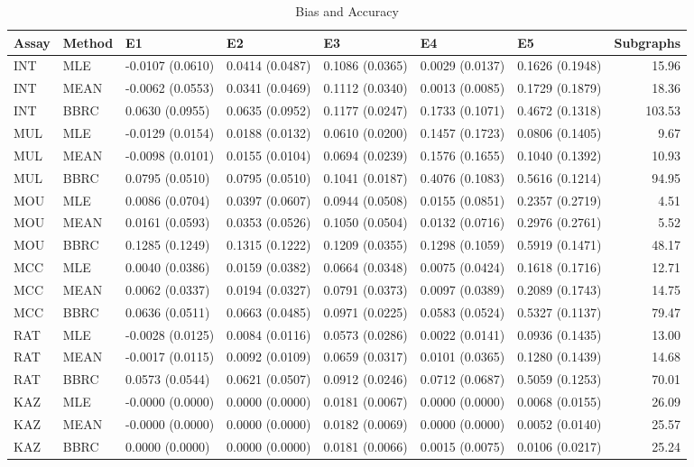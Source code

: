 \begin{table}[t]
\begin{center}
  {\small \begin{tabular}{lllllllr}
  \hline
 Assay & Method & E1 & E2 & E3 & E4 & E5 & Subgraphs \\ 
  \hline
  INT & MLE & -0.0107 (0.0610) & 0.0414 (0.0487) & 0.1086 (0.0365) & 0.0029 (0.0137) & 0.1626 (0.1948) & 15.96 \\ 
  INT & MEAN & -0.0062 (0.0553) & 0.0341 (0.0469) & 0.1112 (0.0340) & 0.0013 (0.0085) & 0.1729 (0.1879) & 18.36 \\ 
  INT & BBRC & 0.0630 (0.0955) & 0.0635 (0.0952) & 0.1177 (0.0247) & 0.1733 (0.1071) & 0.4672 (0.1318) & 103.53 \\ 
  MUL & MLE & -0.0129 (0.0154) & 0.0188 (0.0132) & 0.0610 (0.0200) & 0.1457 (0.1723) & 0.0806 (0.1405) & 9.67 \\ 
  MUL & MEAN & -0.0098 (0.0101) & 0.0155 (0.0104) & 0.0694 (0.0239) & 0.1576 (0.1655) & 0.1040 (0.1392) & 10.93 \\ 
  MUL & BBRC & 0.0795 (0.0510) & 0.0795 (0.0510) & 0.1041 (0.0187) & 0.4076 (0.1083) & 0.5616 (0.1214) & 94.95 \\ 
  MOU & MLE & 0.0086 (0.0704) & 0.0397 (0.0607) & 0.0944 (0.0508) & 0.0155 (0.0851) & 0.2357 (0.2719) & 4.51 \\ 
  MOU & MEAN & 0.0161 (0.0593) & 0.0353 (0.0526) & 0.1050 (0.0504) & 0.0132 (0.0716) & 0.2976 (0.2761) & 5.52 \\ 
  MOU & BBRC & 0.1285 (0.1249) & 0.1315 (0.1222) & 0.1209 (0.0355) & 0.1298 (0.1059) & 0.5919 (0.1471) & 48.17 \\ 
  MCC & MLE & 0.0040 (0.0386) & 0.0159 (0.0382) & 0.0664 (0.0348) & 0.0075 (0.0424) & 0.1618 (0.1716) & 12.71 \\ 
  MCC & MEAN & 0.0062 (0.0337) & 0.0194 (0.0327) & 0.0791 (0.0373) & 0.0097 (0.0389) & 0.2089 (0.1743) & 14.75 \\ 
  MCC & BBRC & 0.0636 (0.0511) & 0.0663 (0.0485) & 0.0971 (0.0225) & 0.0583 (0.0524) & 0.5327 (0.1137) & 79.47 \\ 
  RAT & MLE & -0.0028 (0.0125) & 0.0084 (0.0116) & 0.0573 (0.0286) & 0.0022 (0.0141) & 0.0936 (0.1435) & 13.00 \\ 
  RAT & MEAN & -0.0017 (0.0115) & 0.0092 (0.0109) & 0.0659 (0.0317) & 0.0101 (0.0365) & 0.1280 (0.1439) & 14.68 \\ 
  RAT & BBRC & 0.0573 (0.0544) & 0.0621 (0.0507) & 0.0912 (0.0246) & 0.0712 (0.0687) & 0.5059 (0.1253) & 70.01 \\ 
  KAZ & MLE & -0.0000 (0.0000) & 0.0000 (0.0000) & 0.0181 (0.0067) & 0.0000 (0.0000) & 0.0068 (0.0155) & 26.09 \\ 
  KAZ & MEAN & -0.0000 (0.0000) & 0.0000 (0.0000) & 0.0182 (0.0069) & 0.0000 (0.0000) & 0.0052 (0.0140) & 25.57 \\ 
  KAZ & BBRC & 0.0000 (0.0000) & 0.0000 (0.0000) & 0.0181 (0.0066) & 0.0015 (0.0075) & 0.0106 (0.0217) & 25.24 \\ 
   \hline
 \end{tabular} }
\caption{Bias and Accuracy}
\label{t:anal}
\end{center}
\end{table}
